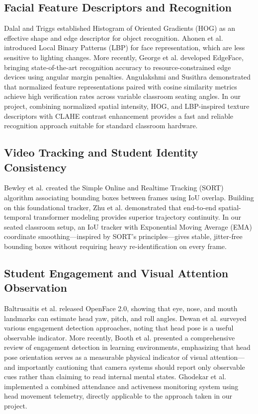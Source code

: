 \documentclass[10pt]{report}
\begin{document}
\subsection{Facial Feature Descriptors and Recognition}
\hspace{0.5cm}Dalal and Triggs \cite{dalal2005histograms} established Histogram of Oriented Gradients (HOG) as an effective shape and edge descriptor for object recognition. Ahonen et al. \cite{ahonen2006face} introduced Local Binary Patterns (LBP) for face representation, which are less sensitive to lighting changes. More recently, George et al. \cite{george2024edgeface} developed EdgeFace, bringing state-of-the-art recognition accuracy to resource-constrained edge devices using angular margin penalties. Angulakshmi and Susithra \cite{angulakshmi2024face} demonstrated that normalized feature representations paired with cosine similarity metrics achieve high verification rates across variable classroom seating angles. In our project, combining normalized spatial intensity, HOG, and LBP-inspired texture descriptors with CLAHE contrast enhancement provides a fast and reliable recognition approach suitable for standard classroom hardware.

\subsection{Video Tracking and Student Identity Consistency}
\hspace{0.5cm}Bewley et al. \cite{bewley2016sort} created the Simple Online and Realtime Tracking (SORT) algorithm associating bounding boxes between frames using IoU overlap. Building on this foundational tracker, Zhu et al. \cite{zhu2023tracking} demonstrated that end-to-end spatial-temporal transformer modeling provides superior trajectory continuity. In our seated classroom setup, an IoU tracker with Exponential Moving Average (EMA) coordinate smoothing—inspired by SORT's principles—gives stable, jitter-free bounding boxes without requiring heavy re-identification on every frame.

\subsection{Student Engagement and Visual Attention Observation}
\hspace{0.5cm}Baltrusaitis et al. \cite{baltrusaitis2018openface} released OpenFace 2.0, showing that eye, nose, and mouth landmarks can estimate head yaw, pitch, and roll angles. Dewan et al. \cite{dewan2019engagement} surveyed various engagement detection approaches, noting that head pose is a useful observable indicator. More recently, Booth et al. \cite{booth2023engagement} presented a comprehensive review of engagement detection in learning environments, emphasizing that head pose orientation serves as a measurable physical indicator of visual attention—and importantly cautioning that camera systems should report only observable cues rather than claiming to read internal mental states. Ghodekar et al. \cite{ghodekar2023activeness} implemented a combined attendance and activeness monitoring system using head movement telemetry, directly applicable to the approach taken in our project.
\end{document}

